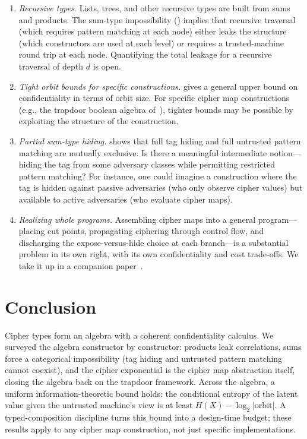 \documentclass[11pt]{article}
\theoremstyle{definition}
\theoremstyle{plain}
\theoremstyle{remark}
\begin{document}
\begin{enumerate}
\item \emph{Recursive types.}
  Lists, trees, and other recursive types are built from sums and products.
  The sum-type impossibility () implies that
  recursive traversal (which requires pattern matching at each node)
  either leaks the structure (which constructors are used at each level)
  or requires a trusted-machine round trip at each node.
  Quantifying the total leakage for a recursive traversal of depth $d$
  is open.

\item \emph{Tight orbit bounds for specific constructions.}
   gives a general upper bound on
  confidentiality in terms of orbit size.
  For specific cipher map constructions (e.g., the trapdoor boolean
  algebra of~\cite{towell2026cipher}), tighter bounds may be possible
  by exploiting the structure of the construction.

\item \emph{Partial sum-type hiding.}
   shows that full tag hiding and full
  untrusted pattern matching are mutually exclusive.
  Is there a meaningful intermediate notion---hiding the tag from
  some adversary classes while permitting restricted pattern matching?
  For instance, one could imagine a construction where the tag is hidden
  against passive adversaries (who only observe cipher values) but
  available to active adversaries (who evaluate cipher maps).

\item \emph{Realizing whole programs.}
  Assembling cipher maps into a general program---placing cut points,
  propagating ciphering through control flow, and discharging the
  expose-versus-hide choice at each branch---is a substantial problem
  in its own right, with its own confidentiality and cost trade-offs.
  We take it up in a companion paper~\cite{towell2026cipherprog}.
\end{enumerate}


\section{Conclusion}

Cipher types form an algebra with a coherent confidentiality
calculus.
We surveyed the algebra constructor by constructor: products leak
correlations, sums force a categorical impossibility (tag hiding
and untrusted pattern matching cannot coexist), and the cipher
exponential is the cipher map abstraction itself, closing the
algebra back on the trapdoor framework.
Across the algebra, a uniform information-theoretic bound holds:
the conditional entropy of the latent value given the untrusted
machine's view is at least $H(X) - \log_2 |\mathrm{orbit}|$.
A typed-composition discipline turns this bound into a design-time
budget; these results apply to any cipher map construction, not
just specific implementations.
\end{document}
